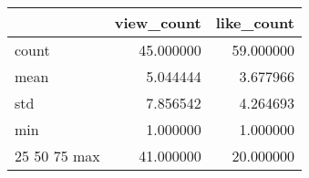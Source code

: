 \begin{tabular}{lrr}
\toprule
 & view_count & like_count \\
\midrule
count & 45.000000 & 59.000000 \\
mean & 5.044444 & 3.677966 \\
std & 7.856542 & 4.264693 \\
min & 1.000000 & 1.000000 \\
25%
50%
75%
max & 41.000000 & 20.000000 \\
\bottomrule
\end{tabular}
